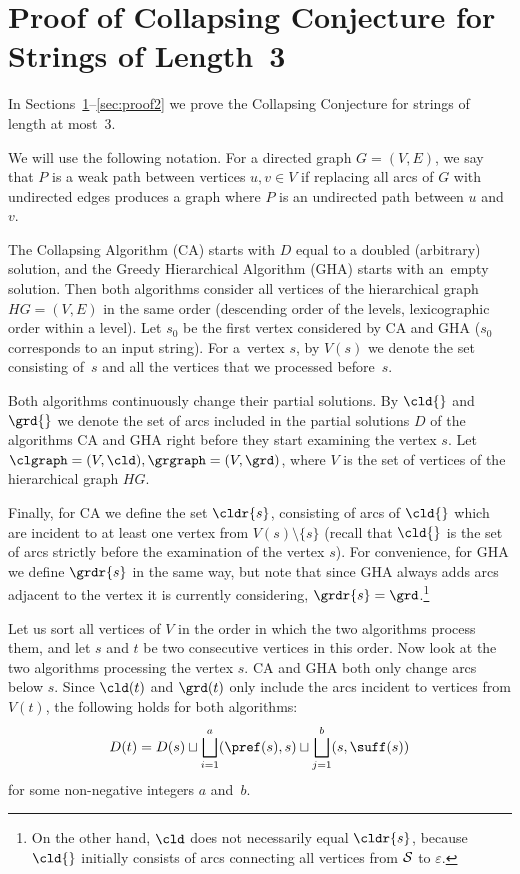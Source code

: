 \section{Proof of Collapsing Conjecture for Strings of Length~3}
\label{subsec:scs3}
In Sections~\ref{subsec:scs3}--\ref{sec:proof2} we prove the Collapsing Conjecture for strings of length at most~$3$.

We will use the following notation. For a directed graph $G=(V,E)$, we say that $P$ is a weak path between vertices $u, v\in V$ if replacing all arcs of $G$ with undirected edges produces a graph where $P$ is an undirected path between $u$ and $v$.

The Collapsing Algorithm (CA) starts with $D$ equal to a doubled (arbitrary) solution, and the Greedy Hierarchical Algorithm (GHA) starts with an~empty solution. Then both algorithms consider all vertices of the hierarchical graph $HG=(V, E)$ in the same order (descending order of the levels, lexicographic order within a level). Let $s_0$ be the first vertex considered by CA and GHA ($s_0$ corresponds to an input string). For a~vertex $s$, by $V(s)$ we denote the set consisting of~$s$ and all the vertices that we processed before~$s$.

Both algorithms continuously change their partial solutions. By $\cld{}$ and $\grd{}$ we denote the set of arcs included in the partial solutions $D$ of the algorithms CA and GHA right before they start examining the vertex $s$. Let $\clgraph = (V, \cld), \grgraph = (V, \grd)$, where $V$ is the set of vertices of the hierarchical graph $HG$. 

Finally, for CA we define the set $\cldr{s}$, consisting of arcs of $\cld{}$ which are incident to at least one vertex from $ V (s) \setminus \{s \} $ (recall that $\cld{}$ is the set of arcs strictly before the examination of the vertex $s$). For convenience, for GHA we define $\grdr{s}$ in the same way, but note that since GHA always adds arcs adjacent to the vertex it is currently considering, $\grdr{s}=\grd$.\footnote{On the other hand, $\cld$ does not necessarily equal $\cldr{s}$, because $\cld{}$ initially consists of arcs connecting all vertices from $ {\cal S} $ to $\varepsilon$.}

Let us sort all vertices of $V$ in the order in which the two algorithms process them, and let $s$ and $t$ be two consecutive vertices in this order. Now look at the two algorithms processing the vertex $s$. CA and GHA both only change arcs below $s$. Since $\cld(t)$ and $\grd(t)$ only include the arcs incident to vertices from $V(t)$, the following holds for both algorithms:
\begin{equation}
\label{eqn:stepcase}
    D(t) = D(s) \sqcup \bigsqcup_{i=1}^{a} (\pref(s), s) \sqcup \bigsqcup_{j=1}^{b} (s, \suff(s))
\end{equation}
for some non-negative integers $ a $ and~$ b $.

